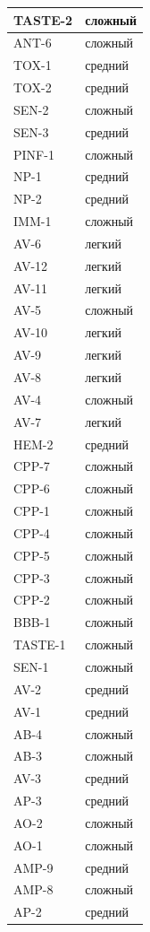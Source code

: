\documentclass[specification,annotation,times]{itmo-student-thesis}
\begin{document}
\begin{longtable}{
| >{\centering\arraybackslash}p{7cm}
| >{\centering\arraybackslash}p{7cm}|
}
TASTE-2 & сложный\\ \hline
ANT-6 & сложный\\ \hline
TOX-1 & средний\\ \hline
TOX-2 & средний\\ \hline
SEN-2 & сложный\\ \hline
SEN-3 & средний\\ \hline
PINF-1 & сложный\\ \hline
NP-1 & средний\\ \hline
NP-2 & средний\\ \hline
IMM-1 & сложный\\ \hline
AV-6 & легкий\\ \hline
AV-12 & легкий\\ \hline
AV-11 & легкий\\ \hline
AV-5 & сложный\\ \hline
AV-10 & легкий\\ \hline
AV-9 & легкий\\ \hline
AV-8 & легкий\\ \hline
AV-4 & сложный\\ \hline
AV-7 & легкий\\ \hline
HEM-2 & средний\\ \hline
CPP-7 & сложный\\ \hline
CPP-6 & сложный\\ \hline
CPP-1 & сложный\\ \hline
CPP-4 & сложный\\ \hline
CPP-5 & сложный\\ \hline
CPP-3 & сложный\\ \hline
CPP-2 & сложный\\ \hline
BBB-1 & сложный\\ \hline
TASTE-1 & сложный\\ \hline
SEN-1 & сложный\\ \hline
AV-2 & средний\\ \hline
AV-1 & средний\\ \hline
AB-4 & сложный\\ \hline
AB-3 & сложный\\ \hline
AV-3 & средний\\ \hline
AP-3 & средний\\ \hline
AO-2 & сложный\\ \hline
AO-1 & сложный\\ \hline
AMP-9 & средний\\ \hline
AMP-8 & сложный\\ \hline
AP-2 & средний\\ \hline

\end{longtable}
\end{document}
